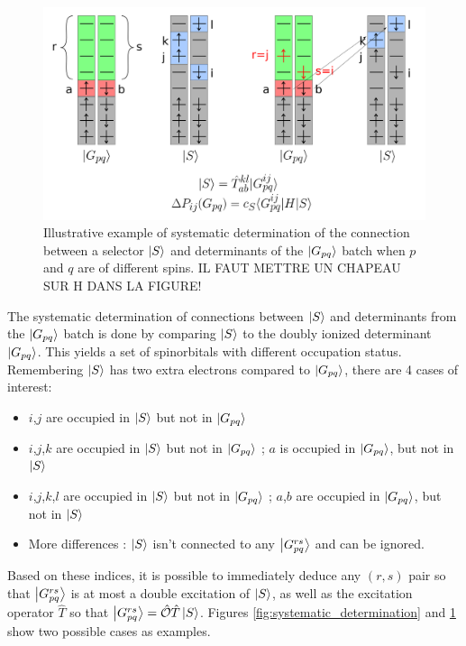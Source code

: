 \documentclass[./thesis.tex]{subfiles}
\begin{document}
\begin{figure}[h!]
        \begin{center}
                \includegraphics[width=0.90\columnwidth]{figures/cipsi/systematic_determination2}       
        \end{center}
        \caption{Illustrative example of systematic determination of the connection between a selector $\ket S$ and determinants of the $\ket {G_{pq}}$ batch when $p$ and $q$ are of different spins. \alert{IL FAUT METTRE UN CHAPEAU SUR H DANS LA FIGURE!}}
        \label{fig:systematic_determination2}
\end{figure}


The systematic determination of connections between $\ket S$ and determinants from the $\ket {G_{pq}}$ batch is done by comparing $\ket S$ to the doubly ionized determinant $\ket {G_{pq}}$. This yields a set of spinorbitals with different occupation status. Remembering $\ket S$ has two extra electrons compared to $\ket {G_{pq}}$, there are 4 cases of interest:
\begin{itemize}

\item
$i$,$j$ are occupied in $\ket S$ but not in $\ket {G_{pq}}$
\item
$i$,$j$,$k$ are occupied in $\ket S$ but not in $\ket {G_{pq}}$ ; $a$ is occupied in $\ket {G_{pq}}$, but not in $\ket S$
\item
$i$,$j$,$k$,$l$ are occupied in $\ket S$ but not in $\ket {G_{pq}}$ ; $a$,$b$ are occupied in $\ket {G_{pq}}$, but not in $\ket S$
\item
More differences : $\ket S$ isn't connected to any $\ket {G_{pq}^{rs}}$ and can be ignored. 

\end{itemize}

Based on these indices, it is possible to immediately deduce any $(r,s)$ pair so that $\ket {G_{pq}^{rs}}$ is at most a double excitation of $\ket S$, as well as the excitation operator $\hat{T}$ so that $\ket {G_{pq}^{rs}}={\hat{\mathcal{O}}} \hat{T} \ket S$. Figures \ref{fig:systematic_determination} and \ref{fig:systematic_determination2} show two possible cases as examples.
\end{document}
